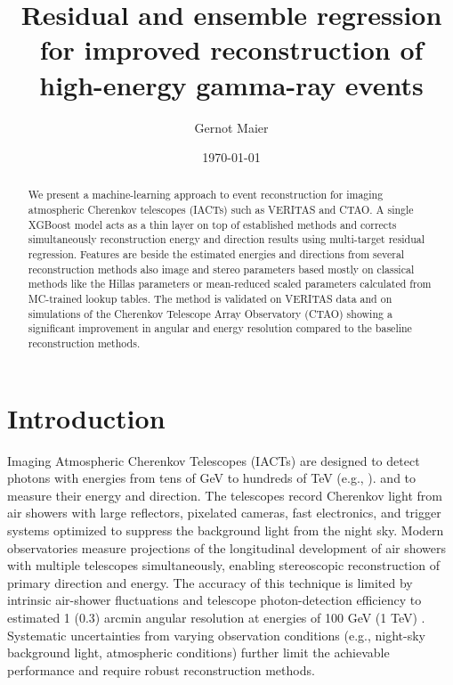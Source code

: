 \documentclass[12pt]{article}
\title{Residual and ensemble regression for improved reconstruction of high-energy gamma-ray events}
\author{Gernot Maier}
\date{\today}
\begin{document}
\maketitle

\begin{abstract}
We present a machine-learning approach to event reconstruction
for imaging atmospheric Cherenkov telescopes (IACTs) such as VERITAS and
CTAO.
A single XGBoost model acts as a thin layer on top of established methods and
corrects simultaneously reconstruction energy and direction results using
multi-target residual regression.
Features are beside the estimated energies and directions from several
reconstruction methods also image and stereo parameters
based mostly on classical methods like
the Hillas parameters or mean-reduced scaled parameters calculated from MC-trained
lookup tables.
The method is validated on VERITAS data and on simulations of the Cherenkov Telescope
Array Observatory (CTAO) showing a significant improvement in angular and energy
resolution compared to the baseline reconstruction methods.
\end{abstract}

\section{Introduction}

Imaging Atmospheric Cherenkov Telescopes (IACTs) are designed to detect
photons with energies from tens of GeV to hundreds of TeV (e.g., \citep{2009ARA&A..47..523H}).
and to measure their energy and direction.
The telescopes record Cherenkov light from air showers with
large reflectors, pixelated cameras, fast electronics, and trigger systems
optimized to suppress the background light from the night sky.
Modern observatories measure projections of the longitudinal development of air showers
with multiple telescopes simultaneously,
enabling stereoscopic reconstruction of primary direction and energy.
The accuracy of this technique is limited by intrinsic air-shower fluctuations and
telescope photon-detection efficiency to estimated
1 (0.3) arcmin angular resolution at energies of 100 GeV (1 TeV)
\citep{hofmann2006performancelimitscherenkovinstruments}.
Systematic uncertainties from varying observation conditions (e.g., night-sky background light,
atmospheric conditions) further limit the achievable performance and require robust
reconstruction methods.
\end{document}
